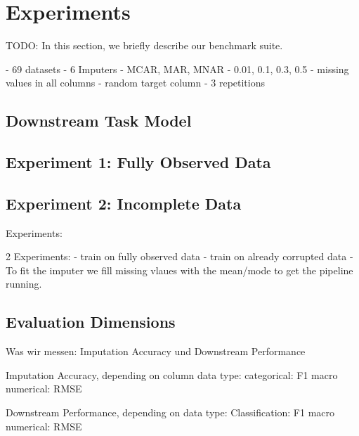 
\section{Experiments}
%
TODO: In this section, we briefly describe our benchmark suite.

- 69 datasets
- 6 Imputers
- MCAR, MAR, MNAR
- 0.01, 0.1, 0.3, 0.5
- missing values in all columns
- random target column
- 3 repetitions


\subsection{Downstream Task Model}
%



\subsection{Experiment 1: Fully Observed Data}
%



\subsection{Experiment 2: Incomplete Data}
%



Experiments:


2 Experiments:
- train on fully observed data
- train on already corrupted data
	- To fit the imputer we fill missing vlaues with the mean/mode to get the pipeline running.



\subsection{Evaluation Dimensions}
%

Was wir messen:
Imputation Accuracy und Downstream Performance

Imputation Accuracy, depending on column data type:
categorical: F1 macro
numerical: RMSE

Downstream Performance, depending on data type:
Classification: F1 macro
numerical: RMSE
